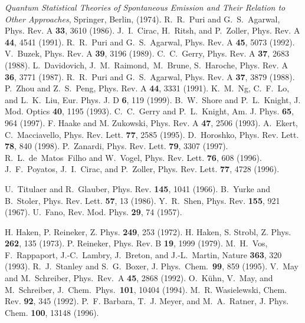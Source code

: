 \documentclass[12pt,twoside,a4paper]{report}
\begin{document}
{\begin{thebibliography}{999}
                 {\it Quantum Statistical Theories of  Spontaneous Emission and Their Relation 
                 to Other Approaches}, Springer,  Berlin, (1974).  
 R.~R.~Puri and G.~S.~Agarwal, Phys. Rev. A {\bf 33}, 3610 (1986).  
 J.~I.~Cirac,  H.~Ritsh, and P.~Zoller, Phys. Rev. A {\bf 44}, 4541 (1991).
 R.~R.~Puri and G.~S.~Agarwal, Phys. Rev. A {\bf 45},  5073 (1992).  
 V.~Buzek, Phys. Rev. A {\bf 39}, 3196 (1989).  
 C.~C.~Gerry, Phys. Rev. A {\bf 37}, 2683 (1988).  
 L.~Davidovich, J.~M.~Raimond,~M.~Brune,  S.~Haroche, Phys. Rev. A {\bf 36}, 3771 (1987).  
  R.~R.~Puri and G.~S.~Agarwal, Phys. Rev. A {\bf 37}, 3879 (1988).
 P.~Zhou and Z.~S.~Peng, Phys. Rev. A {\bf 44}, 3331 (1991).  
 K.~M.~Ng, C.~F.~Lo, and L.~K.~Liu, Eur. Phys. J. D {\bf 6}, 119 (1999).  
 B.~W.~Shore and P.~L.~Knight, J. Mod. Optics {\bf 40}, 1195 (1993). 
 C.~C.~Gerry and P.~L.~Knight,  Am. J. Phys. {\bf 65}, 964 (1997).
 F. Haake and M. Zukowski, Phys. Rev. A {\bf 47}, 2506 (1993).  
 A.~Ekert, C.~Macciavello, Phys. Rev. Lett. {\bf 77}, 2585 (1995).
 D.~Horoshko, Phys. Rev. Lett. {\bf 78}, 840 (1998).
 P.~Zanardi, Phys. Rev. Lett. {\bf 79}, 3307 (1997).
 R.~L.~de~Matos~Filho and W.~Vogel, Phys. Rev. Lett. {\bf 76}, 608 (1996). 
 J.~F.~Poyatos, J.~I.~Cirac, and P.~Zoller, Phys. Rev. Lett. {\bf 77}, 4728 (1996).

  U.~Titulaer and R.~Glauber, Phys. Rev. {\bf 145}, 1041 (1966).
  B.~Yurke and B.~Stoler, Phys. Rev. Lett. {\bf 57}, 13 (1986).
 Y.~R.~Shen, Phys. Rev. {\bf 155}, 921 (1967).
      U.~Fano, { Rev. Mod. Phys.}  {\bf 29}, 74 (1957).




  H. Haken, P. Reineker, Z. Phys. {\bf 249}, 253 (1972).
  H. Haken, S. Strobl, Z. Phys.  {\bf 262}, 135 (1973).
  P. Reineker, Phys. Rev. B {\bf 19}, 1999 (1979).
   M.~H.~Vos, F.~Rappaport,
                  J.-C.~Lambry, J.~Breton, and J.-L.~Martin, Nature {\bf 363}, 320 (1993).
  R.~J.~Stanley and S.~G.~Boxer, J. Phys.\ Chem.\ {\bf 99}, 859 (1995).  
   V.~May and M.~Schreiber, Phys.\ Rev.\ A  {\bf 45}, 2868 (1992).  
  O.~K\"uhn, V.~May, and
                  M.~Schreiber, J.\ Chem.\ Phys.\ {\bf 101}, 10404 (1994).  
 M.~R.
  Wasielewski, Chem. Rev. {\bf 92}, 345 (1992).  
 P.~F.  Barbara, T.~J. Meyer, and M.~A.~Ratner, J. Phys. Chem. {\bf 100}, 13148 (1996).  







\end{thebibliography}}
\end{document}

